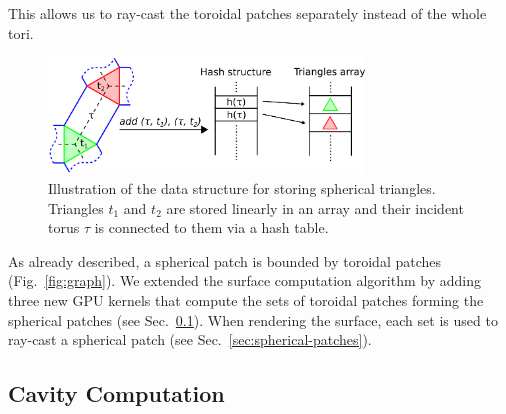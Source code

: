 This allows us to ray-cast the toroidal patches separately instead of the whole tori.

\begin{figure}[bht]
  \centering
  \includegraphics[width=3.3in]{image/hashing.png}
  \caption{Illustration of the data structure for storing spherical triangles. Triangles $t_1$ and $t_2$ are stored linearly in an array and their incident torus $\tau$ is connected to them via a hash table.}
	\label{fig:hashing41}
\end{figure}



As already described, a spherical patch is bounded by toroidal patches (Fig.~\ref{fig:graph}). 
We extended the surface computation algorithm by adding three new GPU kernels that compute the sets of toroidal patches forming the spherical patches (see Sec.~\ref{sec:graph}).
When rendering the surface, each set is used to ray-cast a spherical patch (see Sec.~\ref{sec:spherical-patches}).


\subsection{Cavity Computation}
\label{sec:graph}
   
